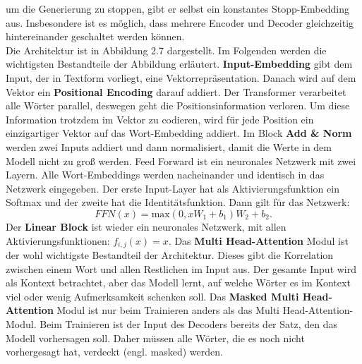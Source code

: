 \documentclass[12pt,letterpaper,ngerman]{article}
\begin{document}
um die Generierung zu stoppen, gibt er selbst ein konstantes 
Stopp-Embedding aus. Insbesondere ist es möglich, dass mehrere
Encoder und Decoder gleichzeitig hintereinander geschaltet werden 
können.\\
Die Architektur ist in Abbildung 2.7 dargestellt. Im Folgenden 
werden die wichtigsten Bestandteile der Abbildung erläutert.
{\bf Input-Embedding}
gibt dem Input, der in Textform vorliegt, eine Vektorrepräsentation.
Danach wird auf dem Vektor ein {\bf Positional Encoding} darauf
addiert.
Der Transformer verarbeitet alle Wörter parallel, deswegen geht die 
Positionsinformation verloren. Um diese Information trotzdem im 
Vektor 
zu codieren, wird für jede Position ein einzigartiger Vektor auf
das Wort-Embedding addiert. 
Im Block {\bf Add \& Norm} werden zwei Inputs addiert und dann 
normalisiert, damit die Werte in dem Modell nicht zu groß werden.
Feed Forward ist ein neuronales Netzwerk mit zwei Layern.
Alle Wort-Embeddings werden nacheinander und identisch in das
Netzwerk eingegeben. Der erste Input-Layer hat als 
Aktivierungsfunktion ein 
Softmax und der zweite hat die Identitätsfunktion.
Dann gilt für das Netzwerk:
\[
  FFN(x) =\text{max}(0, xW_1 + b_1)W_2 + b_2.
\]
Der {\bf Linear Block} ist wieder ein neuronales Netzwerk, mit allen
Aktivierungsfunktionen: $ f_{i,j}(x) = x $. 
Das {\bf Multi Head-Attention} Modul ist der wohl wichtigste 
Bestandteil der Architektur. Dieses gibt die Korrelation 
zwischen einem Wort und allen
Restlichen im Input aus. Der gesamte Input wird als Kontext 
betrachtet, aber das Modell lernt, auf welche Wörter es im 
Kontext viel oder wenig
Aufmerksamkeit schenken soll. Das {\bf Masked Multi Head-Attention}
Modul ist nur beim Trainieren anders als das Multi 
Head-Attention-Modul.
Beim Trainieren ist der Input des Decoders bereits der Satz,
den das Modell vorhersagen soll. Daher müssen alle Wörter, 
die es noch nicht vorhergesagt hat, verdeckt (engl. masked) werden.
\end{document}
